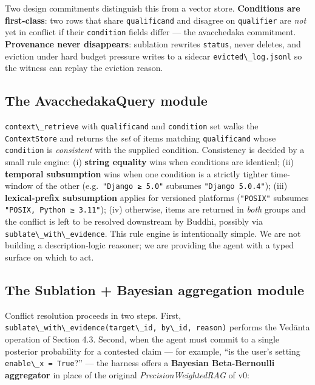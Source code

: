 Two design commitments distinguish this from a vector store. \textbf{Conditions are first-class}: two rows that share \passthrough{\lstinline!qualificand!} and disagree on \passthrough{\lstinline!qualifier!} are \emph{not} yet in conflict if their \passthrough{\lstinline!condition!} fields differ --- the avacchedaka commitment. \textbf{Provenance never disappears}: sublation rewrites \passthrough{\lstinline!status!}, never deletes, and eviction under hard budget pressure writes to a sidecar \passthrough{\lstinline!evicted\_log.jsonl!} so the witness can replay the eviction reason.

\subsection{The AvacchedakaQuery module}\label{the-avacchedakaquery-module}

\passthrough{\lstinline!context\_retrieve!} with \passthrough{\lstinline!qualificand!} and \passthrough{\lstinline!condition!} set walks the \passthrough{\lstinline!ContextStore!} and returns the \emph{set} of items matching \passthrough{\lstinline!qualificand!} whose \passthrough{\lstinline!condition!} is \emph{consistent} with the supplied condition. Consistency is decided by a small rule engine: (i) \textbf{string equality} wins when conditions are identical; (ii) \textbf{temporal subsumption} wins when one condition is a strictly tighter time-window of the other (e.g.~\passthrough{\lstinline!"Django ≥ 5.0"!} subsumes \passthrough{\lstinline!"Django 5.0.4"!}); (iii) \textbf{lexical-prefix subsumption} applies for versioned platforms (\passthrough{\lstinline!"POSIX"!} subsumes \passthrough{\lstinline!"POSIX, Python ≥ 3.11"!}); (iv) otherwise, items are returned in \emph{both} groups and the conflict is left to be resolved downstream by Buddhi, possibly via \passthrough{\lstinline!sublate\_with\_evidence!}. This rule engine is intentionally simple. We are not building a description-logic reasoner; we are providing the agent with a typed surface on which to act.

\subsection{The Sublation + Bayesian aggregation module}\label{the-sublation-bayesian-aggregation-module}

Conflict resolution proceeds in two steps. First, \passthrough{\lstinline!sublate\_with\_evidence(target\_id, by\_id, reason)!} performs the Vedānta operation of Section 4.3. Second, when the agent must commit to a single posterior probability for a contested claim --- for example, ``is the user's setting \passthrough{\lstinline!enable\_x = True!}?'' --- the harness offers a \textbf{Bayesian Beta-Bernoulli aggregator} in place of the original \emph{PrecisionWeightedRAG} of v0:

